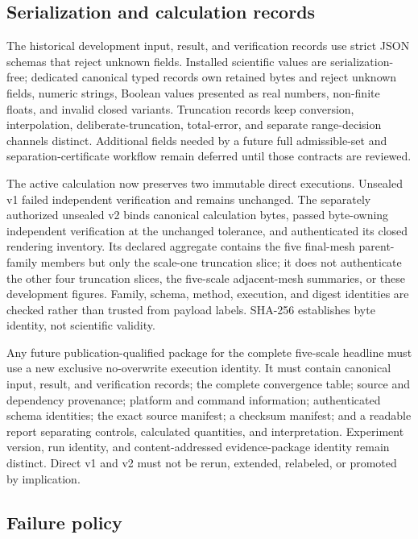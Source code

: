 \documentclass[11pt]{article}
\begin{document}
\subsection{Serialization and calculation records}

The historical development input, result, and verification records use strict JSON
schemas that reject unknown fields. Installed scientific values are serialization-free;
dedicated canonical typed records own retained bytes and reject unknown fields, numeric
strings, Boolean values presented as real numbers, non-finite floats, and invalid closed
variants. Truncation records keep conversion, interpolation, deliberate-truncation,
total-error, and separate range-decision channels distinct. Additional fields needed by
a future full admissible-set and separation-certificate workflow remain deferred until
those contracts are reviewed.

The active calculation now preserves two immutable direct executions. Unsealed v1 failed
independent verification and remains unchanged. The separately authorized unsealed v2
binds canonical calculation bytes, passed byte-owning independent verification at the
unchanged tolerance, and authenticated its closed rendering inventory. Its declared
aggregate contains the five final-mesh parent-family members but only the scale-one
truncation slice; it does not authenticate the other four truncation slices, the
five-scale adjacent-mesh summaries, or these development figures. Family, schema,
method, execution, and digest identities are checked rather than trusted from payload
labels. SHA-256 establishes byte identity, not scientific validity.

Any future publication-qualified package for the complete five-scale headline must use a
new exclusive no-overwrite execution identity. It must contain canonical input, result,
and verification records; the complete convergence table; source and dependency
provenance; platform and command information; authenticated schema identities; the exact
source manifest; a checksum manifest; and a readable report separating controls,
calculated quantities, and interpretation. Experiment version, run identity, and
content-addressed evidence-package identity remain distinct. Direct v1 and v2 must not
be rerun, extended, relabeled, or promoted by implication.

\subsection{Failure policy}
\end{document}
